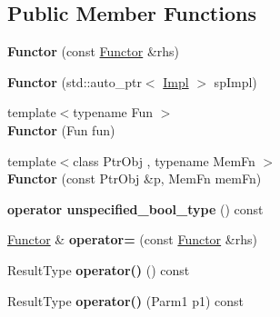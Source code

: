 \subsection*{Public Member Functions}
\begin{DoxyCompactItemize}
\item 
\hypertarget{classLoki_1_1Functor_aae62415b5a4a3bdd6dc7c0337ec3b71c}{}{\bfseries Functor} (const \hyperlink{classLoki_1_1Functor}{Functor} \&rhs)\label{classLoki_1_1Functor_aae62415b5a4a3bdd6dc7c0337ec3b71c}

\item 
\hypertarget{classLoki_1_1Functor_ac7cd37018d688d04ebdc1723c7e518c0}{}{\bfseries Functor} (std\+::auto\+\_\+ptr$<$ \hyperlink{classLoki_1_1FunctorImpl}{Impl} $>$ sp\+Impl)\label{classLoki_1_1Functor_ac7cd37018d688d04ebdc1723c7e518c0}

\item 
\hypertarget{classLoki_1_1Functor_a72976a43d0026281f3e69037363f9043}{}{\footnotesize template$<$typename Fun $>$ }\\{\bfseries Functor} (Fun fun)\label{classLoki_1_1Functor_a72976a43d0026281f3e69037363f9043}

\item 
\hypertarget{classLoki_1_1Functor_ae89f5218d4af7084c8628965838fa789}{}{\footnotesize template$<$class Ptr\+Obj , typename Mem\+Fn $>$ }\\{\bfseries Functor} (const Ptr\+Obj \&p, Mem\+Fn mem\+Fn)\label{classLoki_1_1Functor_ae89f5218d4af7084c8628965838fa789}

\item 
\hypertarget{classLoki_1_1Functor_abfcfc832e79cccf62e0720e069b46d88}{}{\bfseries operator unspecified\+\_\+bool\+\_\+type} () const \label{classLoki_1_1Functor_abfcfc832e79cccf62e0720e069b46d88}

\item 
\hypertarget{classLoki_1_1Functor_ac051d50ce31c4375384bda90db062c29}{}\hyperlink{classLoki_1_1Functor}{Functor} \& {\bfseries operator=} (const \hyperlink{classLoki_1_1Functor}{Functor} \&rhs)\label{classLoki_1_1Functor_ac051d50ce31c4375384bda90db062c29}

\item 
\hypertarget{classLoki_1_1Functor_aaa6e11645f4da2ccb4238c415c8aa34e}{}Result\+Type {\bfseries operator()} () const \label{classLoki_1_1Functor_aaa6e11645f4da2ccb4238c415c8aa34e}

\item 
\hypertarget{classLoki_1_1Functor_a268c85cd63ecdab1861196629d85fa58}{}Result\+Type {\bfseries operator()} (Parm1 p1) const \label{classLoki_1_1Functor_a268c85cd63ecdab1861196629d85fa58}


\end{DoxyCompactItemize}
